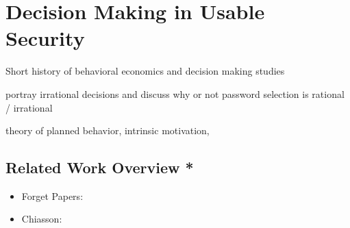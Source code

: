 
\chapter[Decision Making in Usable Security]{Decision Making in Usable Security}\label{chap:rw:persuasion}

Short history of behavioral economics and decision making studies

portray irrational decisions and discuss why or not password selection is rational / irrational

theory of planned behavior, intrinsic motivation, 


\section*{Related Work Overview *}
\begin{itemize}
\item Forget Papers: \cite{Forget2007PersuasionEducationSecurity} \cite{Forget2008ImprovingPasswordsThroughPersuasion} \cite{Forget2008MemorabilityPersuasivePasswords} \cite{Forget2008a}
\item Chiasson: \cite{Chiasson2008PCCP}
\end{itemize}


\cite{Furnell2017GuidanceCompliance,Kaptein2015,Gulenko2014PasswordsEmotion,Azevedo2012AuthenticationGame,Kroeze2012GamifyingAuthentication,Schneider2016,Cialdini2003,Forget2007HelpingUsers,Scott1995GDMS,Kim2015,Bellur2014,Baharin2015,Adams2015MindlessComputing,Liao,Han1994,Balebako2011,Acquisti2009,Forget2007PersuasionEducationSecurity,Forget2008ImprovingPasswordsThroughPersuasion,Xu2007,Zakaria2013DesigningEffectiveSecurityMessages,Egelman2010PleaseContinueToHold,Yevseyeva2014,DiGioia2005SocialNavigationUsableSecurity,Chiasson2008PCCP,Wiafe2012,Weirich2005PersuasivePasswordSecurity,Forget2008MemorabilityPersuasivePasswords,Jeske2013,Wang2014,Weirich2001PrettyGoodPersuasion,Adjerid,Shiv2005,Wiafe2012a,Almuhimedi2015a,Radke2013,Arachchilage2013GameDesingPhishing,Ashenden2013SecurityLikeSoap,Bahr2013,Korff2014TooMuchChoice,Muscanell2014,Woodruff2014PrivacyFundamentalist,Korff2014,Goldstein2008,Forget2008PersuasionStrongerPasswords,Wang2013,Hamari2014,Jameson2011PreferentialChoice,Instructor2013,Mamduhi2012,Lockton2012CognitiveBiases,Choe,Fogg2002Persuasive,Fogg2009,Lockton2010,Hekler2013,Lockton2009,Lee2011MiningBehavioralEconomics}



